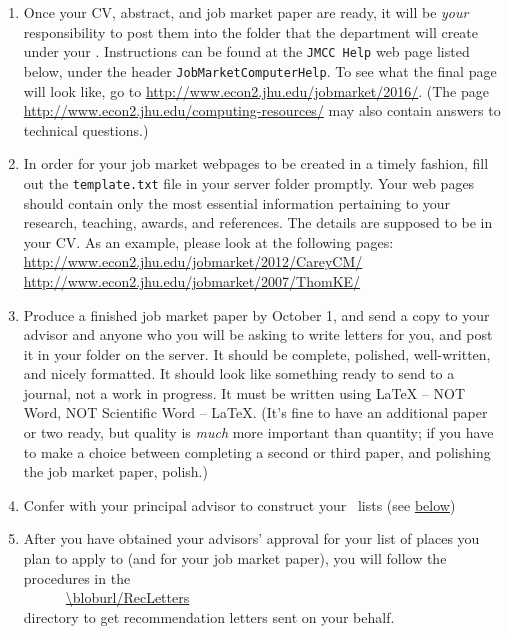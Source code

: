 \documentclass{\classes/econtex}
\begin{document}
\begin{enumerate}
  \hypertarget{Post-To-Server}{}
\item Once your CV, abstract, and job market paper are ready, it will
  be \textit{your} responsibility to post them into the folder that
  the department will create under your \Moniker.
  Instructions can be found at the \texttt{JMCC Help} web page listed
  below, under the header \texttt{JobMarketComputerHelp}.  To see what
  the final page will look like, go to
  \url{http://www.econ2.jhu.edu/jobmarket/2016/}.  (The page
  \url{http://www.econ2.jhu.edu/computing-resources/}
  may also contain answers to technical questions.)
  
  \hypertarget{Template}{}
\item In order for your job market webpages to be created in a timely fashion, 
  fill out the \texttt{template.txt} file in your server folder promptly.
  Your web pages should contain only the most essential information 
  pertaining to your research, teaching, awards, and references. 
  The details are supposed to be in your CV.
  As an example, please look at the following pages:\\
  {\small \url{http://www.econ2.jhu.edu/jobmarket/2012/CareyCM/}}\\
  {\small \url{http://www.econ2.jhu.edu/jobmarket/2007/ThomKE/}}
  

  \hypertarget{Produce-Job-Paper}{}
\item Produce a finished job market paper by October 1, and send a copy to your advisor and anyone who you will be asking to write letters for you, and post it in your folder on the server.  It should be complete, polished, well-written, and nicely formatted.  It should look like something ready to send to a journal, not a work in progress.  It must be written using {\LaTeX} -- NOT Word, NOT Scientific Word -- {\LaTeX}.  (It's fine to have an additional paper or two ready, but quality is \textit{much} more important than quantity; if you have to make a choice between completing a second or third paper, and polishing the job market paper, polish.)
  
  \hypertarget{\EM}{}
\item Confer with your principal advisor to construct your~{\EMtt} lists (see \hyperlink{below}{below})

  
  \hypertarget{Rec-Letters}{}
\item After you have obtained your advisors' approval for your list of
  places you plan to apply to (and for your job market paper), you
  will follow the procedures in the \\
  ~~~~~~\url{\bloburl/RecLetters} \\
  directory to get recommendation letters sent on your behalf.


\end{enumerate}
\end{document}
